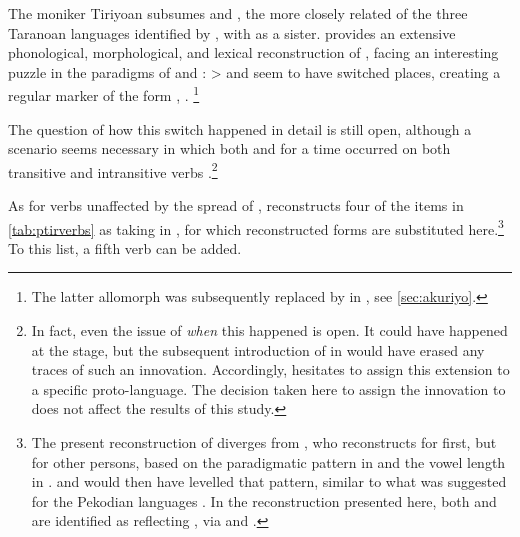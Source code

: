



\subsubsection{\PTir {}}
\label{sec:taranoan}
The moniker Tiriyoan \parencite{glottolog} subsumes \trio and \akuriyo, the more closely related of the three Taranoan languages identified by \textcite{girard1971proto}, with \carijo as a sister.
\textcite{meira1998proto} provides an extensive phonological, morphological, and lexical reconstruction of \PTar, facing an interesting puzzle in the \setone paradigms of \trio and \akuriyo: \PC {}>  and   seem to have switched places, creating a regular  marker of the form ,  .%
\footnote{The latter allomorph was subsequently replaced by  in \akuriyo, see \cref{sec:akuriyo}.}

The question of how this switch happened in detail \parencite[107--112]{meira1998proto} is still open, although a scenario seems necessary in which both  and  for a time occurred on both transitive and intransitive verbs \parencite[112]{meira1998proto}.\footnote{
In fact, even the issue of \emph{when} this happened is open.
It could have happened at the \PTar stage, but the subsequent introduction of  in \carijo {} would have erased any traces of such an innovation.
Accordingly, \textcite{meira1998proto} hesitates to assign this extension to a specific proto-language.
The decision taken here to assign the innovation to \PTir does not affect the results of this study.}



As for verbs unaffected by the spread of , \textcite{meira1998proto} reconstructs four of the items in \cref{tab:ptirverbs} as taking  in \PTar, for which reconstructed \PTir forms are substituted here.\footnote{The present reconstruction of  diverges from , who reconstructs \PTar {} for first, but  for other persons, based on the paradigmatic pattern in \trio and the vowel length in \akuriyo.
\akuriyo and \carijo would then have levelled that pattern, similar to what was suggested for the Pekodian languages .
In the reconstruction presented here, both \trio {} and \akuriyo {} are identified as reflecting  , via \PTar {} and \PTir {}.}
To this list, a fifth verb   can be added.

